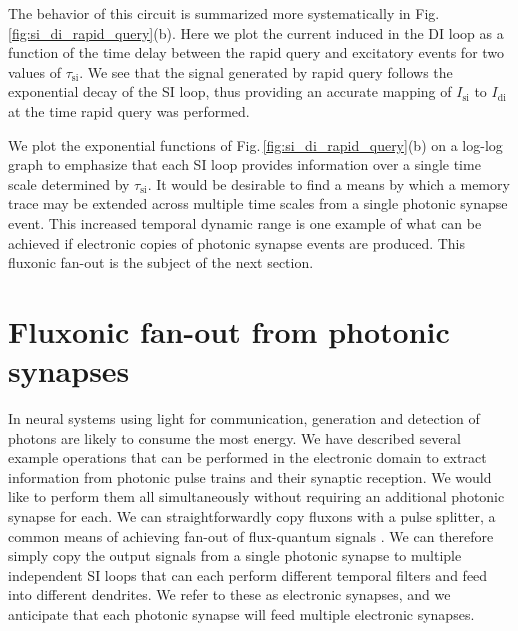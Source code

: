 \documentclass[twocolumn]{article}
\begin{document}
The behavior of this circuit is summarized more systematically in Fig.\,\ref{fig:si_di_rapid_query}(b). Here we plot the current induced in the DI loop as a function of the time delay between the rapid query and excitatory events for two values of $\tau_{\mathrm{si}}$. We see that the signal generated by rapid query follows the exponential decay of the SI loop, thus providing an accurate mapping of $I_{\mathrm{si}}$ to $I_{\mathrm{di}}$ at the time rapid query was performed. 

We plot the exponential functions of Fig.\,\ref{fig:si_di_rapid_query}(b) on a log-log graph to emphasize that each SI loop provides information over a single time scale determined by $\tau_{\mathrm{si}}$. It would be desirable to find a means by which a memory trace may be extended across multiple time scales from a single photonic synapse event. This increased temporal dynamic range is one example of what can be achieved if electronic copies of photonic synapse events are produced. This fluxonic fan-out is the subject of the next section.

\section{\label{sec:fluxonic_fanout}Fluxonic fan-out from photonic synapses}
In neural systems using light for communication, generation and detection of photons are likely to consume the most energy. We have described several example operations that can be performed in the electronic domain to extract information from photonic pulse trains and their synaptic reception. We would like to perform them all simultaneously without requiring an additional photonic synapse for each. We can straightforwardly copy fluxons with a pulse splitter, a common means of achieving fan-out of flux-quantum signals \cite{lise1991}. We can therefore simply copy the output signals from a single photonic synapse to multiple independent SI loops that can each perform different temporal filters and feed into different dendrites. We refer to these as electronic synapses, and we anticipate that each photonic synapse will feed multiple electronic synapses.
\end{document}
